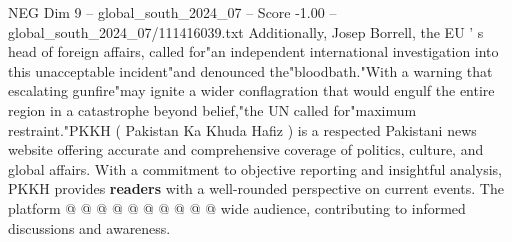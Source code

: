 \begin{textsample}{NEG Dim 9 – global\_south\_2024\_07 – Score -1.00 – global\_south\_2024\_07/111416039.txt}
Additionally, Josep Borrell, the EU ' s head of foreign affairs, called for"an independent international investigation into this unacceptable incident"and denounced the"bloodbath."With a warning that escalating gunfire"may ignite a wider conflagration that would engulf the entire region in a catastrophe beyond belief,"the UN called for"maximum restraint."PKKH ( Pakistan Ka Khuda Hafiz ) is a respected Pakistani news website offering accurate and comprehensive coverage of politics, culture, and global affairs.
With a commitment to objective reporting and insightful analysis, PKKH provides \textbf{readers} with a well-rounded perspective on current events.
The platform @ @ @ @ @ @ @ @ @ @ wide audience, contributing to informed discussions and awareness.

\end{textsample}
